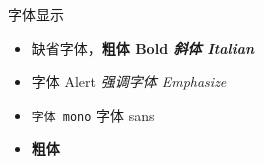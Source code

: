 \begin{frame}{字体显示}
    \begin{itemize} %
        \item 缺省字体，\bf{粗体 Bold} \it{斜体 Italian}
        \item \alert{字体 Alert} \emph{强调字体 Emphasize}
        \item \texttt{字体 mono} \textsf{字体 sans}
        \item {\bf 粗体} {\bf {}} 
    \end{itemize}
\end{frame}
